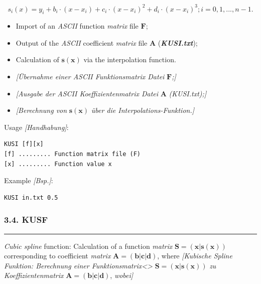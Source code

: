 \documentclass[
]{article}
\begin{document}
\[s_{i}(x) = y_{i} + b_{i} \cdot \left( x - x_{i} \right) + c_{i} \cdot \left( x - x_{i} \right)^{2} + d_{i} \cdot \left( x - x_{i} \right)^{3};i = 0,1,...,n - 1.\]

\begin{itemize}
\item
  Import of an \emph{ASCII} function \emph{matrix} file \(\mathbf{F}\);
\item
  Output of the \emph{ASCII} coefficient \emph{matrix} file
  \(\mathbf{A}\) (\textbf{\emph{KUSI.txt}});
\item
  Calculation of \(\mathbf{s}\left( \mathbf{x} \right)\) via the
  interpolation function.
\item
  \emph{{[}Übernahme einer ASCII Funktionsmatrix Datei}
  \(\mathbf{F}\)\emph{;{]}}
\item
  \emph{{[}Ausgabe der ASCII Koeffizientenmatrix Datei} \(\mathbf{A}\)
  \emph{(KUSI.txt);{]}}
\item
  \emph{{[}Berechnung von} \(\mathbf{s}\left( \mathbf{x} \right)\)
  \emph{über die Interpolations-Funktion.{]}}
\end{itemize}

Usage \emph{{[}Handhabung{]}}:

\begin{verbatim}
KUSI [f][x]
[f] ......... Function matrix file (F)
[x] ......... Function value x
\end{verbatim}

Example \emph{{[}Bsp.{]}}:

\begin{verbatim}
KUSI in.txt 0.5
\end{verbatim}

\hypertarget{kusf}{%
\subsubsection{3.4. KUSF}\label{kusf}}

\begin{center}\rule{0.5\linewidth}{0.5pt}\end{center}

\emph{Cubic spline} function: Calculation of a function \emph{matrix}
\(\mathbf{S =}\left( \mathbf{x|s}\left( \mathbf{x} \right) \right)\)
corresponding to coefficient \emph{matrix}
\(\mathbf{A =}\left( \mathbf{b}\left| \mathbf{c} \right|\mathbf{d} \right)\),
where \emph{{[}Kubische Spline Funktion: Berechnung einer
Funktionsmatrix\textless{}\ins\textgreater{}}
\(\mathbf{S =}\left( \mathbf{x|s}\left( \mathbf{x} \right) \right)\)
\emph{zu Koeffizientenmatrix}
\(\mathbf{A =}\left( \mathbf{b}\left| \mathbf{c} \right|\mathbf{d} \right)\),
\emph{wobei{]}}
\end{document}

